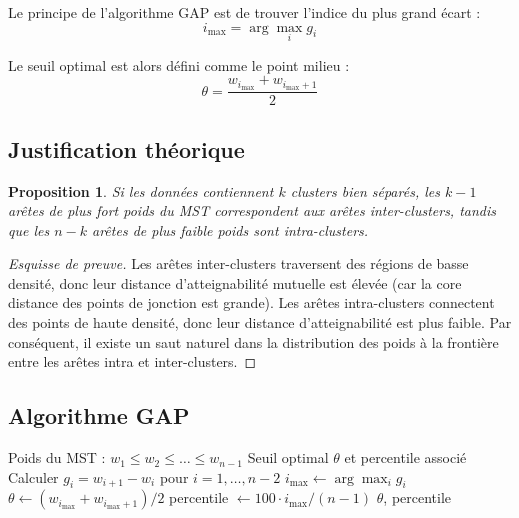 \documentclass[11pt,a4paper]{article}
\newtheorem{proposition}[definition]{Proposition}
\begin{document}
Le principe de l'algorithme GAP est de trouver l'indice du plus grand écart :
\begin{equation}
\boxed{i_{\max} = \arg\max_{i} g_i}
\end{equation}

Le seuil optimal est alors défini comme le point milieu :
\begin{equation}
\boxed{\theta = \frac{w_{i_{\max}} + w_{i_{\max}+1}}{2}}
\end{equation}

\subsection{Justification théorique}

\begin{proposition}
Si les données contiennent $k$ clusters bien séparés, les $k-1$ arêtes de plus fort poids du MST correspondent aux arêtes inter-clusters, tandis que les $n-k$ arêtes de plus faible poids sont intra-clusters.
\end{proposition}

\begin{proof}[Esquisse de preuve]
Les arêtes inter-clusters traversent des régions de basse densité, donc leur distance d'atteignabilité mutuelle est élevée (car la core distance des points de jonction est grande). Les arêtes intra-clusters connectent des points de haute densité, donc leur distance d'atteignabilité est plus faible. Par conséquent, il existe un saut naturel dans la distribution des poids à la frontière entre les arêtes intra et inter-clusters.
\end{proof}

\subsection{Algorithme GAP}

\begin{algorithm}[htbp]
\caption{Algorithme GAP pour la sélection du seuil}
\begin{algorithmic}[1]
\REQUIRE Poids du MST : $w_1 \leq w_2 \leq \ldots \leq w_{n-1}$
\ENSURE Seuil optimal $\theta$ et percentile associé
\STATE Calculer $g_i = w_{i+1} - w_i$ pour $i = 1, \ldots, n-2$
\STATE $i_{\max} \leftarrow \arg\max_i g_i$
\STATE $\theta \leftarrow (w_{i_{\max}} + w_{i_{\max}+1})/2$
\STATE percentile $\leftarrow 100 \cdot i_{\max} / (n-1)$
\RETURN $\theta$, percentile
\end{algorithmic}
\end{algorithm}
\end{document}
